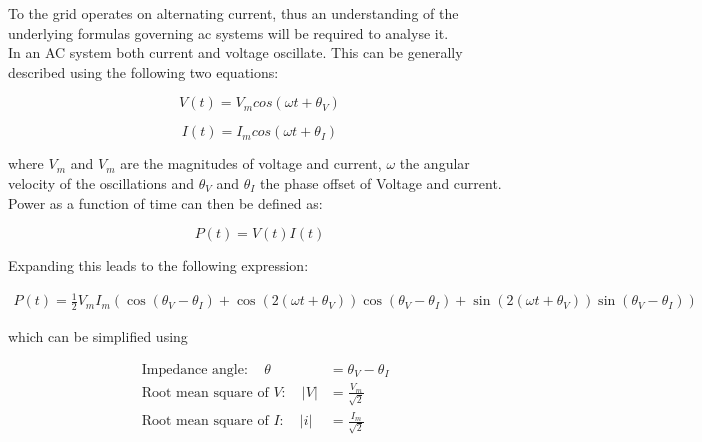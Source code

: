 To the grid operates on alternating current, thus an
understanding of the underlying formulas governing ac systems will be required to analyse it. \\
In an AC system both current and voltage oscillate. This can be generally described using the following two equations:

\begin{equation}
    V(t) = V_m cos(\omega t + \theta_V)
    \label{eq:ac:voltage_ac}
\end{equation}

\begin{equation}
    I(t) = I_m cos(\omega t + \theta_I)
    \label{eq:ac:current_ac}
\end{equation}

where $V_m$ and $V_m$ are the magnitudes of voltage and current,
$\omega$ the angular velocity of the oscillations and $\theta_V$ and $\theta_I$
the phase offset of Voltage and current.\\
Power as a function of time can then be defined as:

\begin{equation}
    P(t) = V(t)I(t)
    \label{eq:ac:power_t}
\end{equation}

Expanding this leads to the following expression:

\begin{equation}
    \begin{aligned}
        P(t) = \frac{1}{2} V_m I_m (\cos (\theta_V-\theta_I) 
        + \cos(2(\omega t + \theta_V))\cos(\theta_V-\theta_I)
        + \sin(2(\omega t + \theta_V))\sin(\theta_V-\theta_I))
    \end{aligned}
    \label{eq:ac:power_ac_long}
\end{equation}

which can be simplified using

\begin{equation}
    \begin{aligned}
        &\text{Impedance angle}: \quad  \theta &= \theta_V - \theta_I \\
        &\text{Root mean square of } V: \quad  |V| &= \frac{V_m}{\sqrt{2}} \\
        &\text{Root mean square of } I: \quad  |i| &= \frac{I_m}{\sqrt{2}} \\
    \end{aligned}
    \label{eq:ac:power_def}
\end{equation}
         
